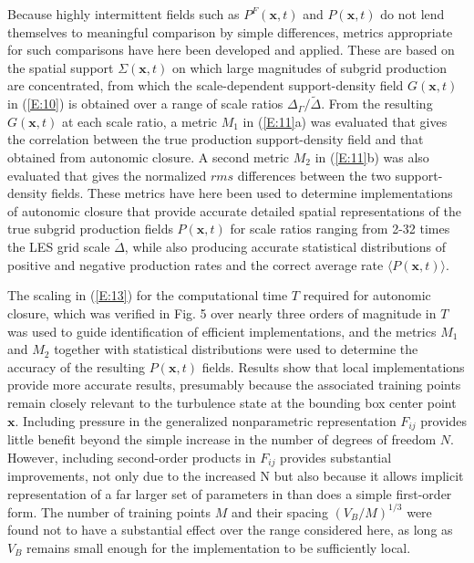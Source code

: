 Because highly intermittent fields such as $P^{F}(\mathbf{x},t)$ and $P(\mathbf{x},t)$  do not lend themselves to meaningful comparison by simple differences, metrics appropriate for such comparisons have here been developed and applied. These are based on the spatial support $\Sigma(\mathbf{x},t)$  on which large magnitudes of subgrid production are concentrated, from which the scale-dependent support-density field $G(\mathbf{x},t)$ in (\ref{E:10}) is obtained over a range of scale ratios $\Delta_{\Gamma}/\widetilde{\Delta}$. From the resulting $G(\mathbf{x},t)$ at each scale ratio, a metric $M_1$  in (\ref{E:11}a) was evaluated that gives the correlation between the true production support-density field and that obtained from autonomic closure. A second metric $M_2$  in (\ref{E:11}b) was also evaluated that gives the normalized $rms$ differences between the two support-density fields. These metrics have here been used to determine implementations of autonomic closure that provide accurate detailed spatial representations of the true subgrid production fields $P(\mathbf{x},t)$  for scale ratios ranging from 2-32 times the LES grid scale $\widetilde{\Delta}$, while also producing accurate statistical distributions of positive and negative production rates and the correct average rate $\langle P(\mathbf{x},t) \rangle$.

The scaling in (\ref{E:13}) for the computational time $T$ required for autonomic closure, which was verified in Fig. 5 over nearly three orders of magnitude in $T$ was used to guide identification of efficient implementations, and the metrics $M_1$  and $M_2$  together with statistical distributions were used to determine the accuracy of the resulting $P(\mathbf{x},t)$  fields. Results show that local implementations provide more accurate results, presumably because the associated training points remain closely relevant to the turbulence state at the bounding box center point $\mathbf{x}$. Including pressure in the generalized nonparametric representation  $F_{ij}$ provides little benefit beyond the simple increase in the number of degrees of freedom $N$. However, including second-order products in $F_{ij}$  provides substantial improvements, not only due to the increased N but also because it allows implicit representation of a far larger set of parameters in   than does a simple first-order form. The number of training points $M$ and their spacing $(V_B/M)^{1/3}$ were found not to have a substantial effect over the range considered here, as long as $V_B$  remains small enough for the implementation to be sufficiently local.

